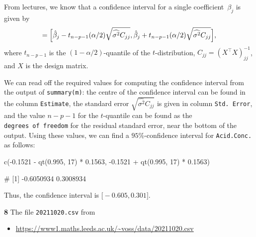 \documentclass[
  a4paper,
]{article}
\newenvironment{Shaded}{\begin{snugshade}}{\end{snugshade}}
\newcommand{\DecValTok}[1]{\textcolor[rgb]{0.00,0.00,0.81}{#1}}
\newcommand{\FloatTok}[1]{\textcolor[rgb]{0.00,0.00,0.81}{#1}}
\newcommand{\FunctionTok}[1]{\textcolor[rgb]{0.00,0.00,0.00}{#1}}
\newcommand{\NormalTok}[1]{#1}
\newcommand{\SpecialCharTok}[1]{\textcolor[rgb]{0.00,0.00,0.00}{#1}}
\providecommand{\tightlist}{%
  \setlength{\itemsep}{0pt}\setlength{\parskip}{0pt}}
\theoremstyle{definition}
\theoremstyle{definition}
\theoremstyle{definition}
\theoremstyle{definition}
\theoremstyle{remark}
\begin{document}
\begin{myanswers}
From lectures, we know that a confidence interval for a single
coefficient~\(\beta_j\) is given by
\begin{equation*}
  [U, V]
  = \Bigl[ \hat\beta_j - t_{n-p-1}(\alpha/2) \sqrt{\widehat{\sigma^2} C_{jj}},
        \hat\beta_j + t_{n-p-1}(\alpha/2) \sqrt{\widehat{\sigma^2} C_{jj}} \Bigr],
\end{equation*}
where \(t_{n-p-1}\) is the \((1-\alpha/2)\)-quantile of the \(t\)-distribution,
\(C_{jj} = (X^\top X)^{-1}_{jj}\), and \(X\) is the design matrix.

We can read off the required values for computing the confidence
interval from the output of \texttt{summary(m)}: the centre of the
confidence interval can be found in the column \texttt{Estimate}, the
standard error \(\sqrt{\widehat{\sigma^2} C_{jj}}\) is given in column
\texttt{Std.\ Error}, and the value \(n-p-1\) for the \(t\)-quantile can be
found as the \texttt{degrees\ of\ freedom} for the residual standard error,
near the bottom of the output. Using these values, we can find a
\(95\%\)-confidence interval for \texttt{Acid.Conc.} as
follows:

\begin{Shaded}
\begin{Highlighting}[]
\FunctionTok{c}\NormalTok{(}\SpecialCharTok{{-}}\FloatTok{0.1521} \SpecialCharTok{{-}} \FunctionTok{qt}\NormalTok{(}\FloatTok{0.995}\NormalTok{, }\DecValTok{17}\NormalTok{) }\SpecialCharTok{*} \FloatTok{0.1563}\NormalTok{, }\SpecialCharTok{{-}}\FloatTok{0.1521} \SpecialCharTok{+} \FunctionTok{qt}\NormalTok{(}\FloatTok{0.995}\NormalTok{, }\DecValTok{17}\NormalTok{) }\SpecialCharTok{*} \FloatTok{0.1563}\NormalTok{)}
\end{Highlighting}
\end{Shaded}

\begin{Shaded}
\begin{Highlighting}[]
\NormalTok{\# [1] {-}0.6050934  0.3008934}
\end{Highlighting}
\end{Shaded}

Thus, the confidence interval is \(\bigl[ -0.605, 0.301 \bigr]\).

\end{myanswers}

\textbf{8} The file \texttt{20211020.csv} from

\begin{itemize}
\tightlist
\item
  \url{https://www1.maths.leeds.ac.uk/~voss/data/20211020.csv}
\end{itemize}
\end{document}
